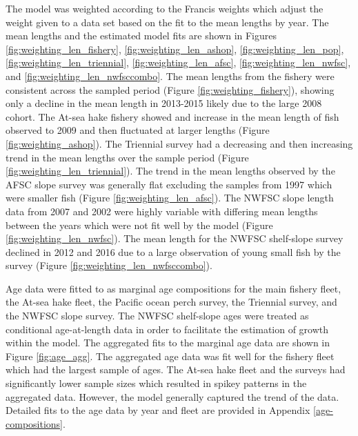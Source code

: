 \documentclass[12pt,]{article}
\begin{document}
The model was weighted according to the Francis weights which adjust the
weight given to a data set based on the fit to the mean lengths by year.
The mean lengths and the estimated model fits are shown in Figures
\ref{fig:weighting_len_fishery}, \ref{fig:weighting_len_ashop},
\ref{fig:weighting_len_pop}, \ref{fig:weighting_len_triennial},
\ref{fig:weighting_len_afsc}, \ref{fig:weighting_len_nwfsc}, and
\ref{fig:weighting_len_nwfsccombo}. The mean lengths from the fishery
were consistent across the sampled period (Figure
\ref{fig:weighting_fishery}), showing only a decline in the mean length
in 2013-2015 likely due to the large 2008 cohort. The At-sea hake
fishery showed and increase in the mean length of fish observed to 2009
and then fluctuated at larger lengths (Figure
\ref{fig:weighting_ashop}). The Triennial survey had a decreasing and
then increasing trend in the mean lengths over the sample period (Figure
\ref{fig:weighting_len_triennial}). The trend in the mean lengths
observed by the AFSC slope survey was generally flat excluding the
samples from 1997 which were smaller fish (Figure
\ref{fig:weighting_len_afsc}). The NWFSC slope length data from 2007 and
2002 were highly variable with differing mean lengths between the years
which were not fit well by the model (Figure
\ref{fig:weighting_len_nwfsc}). The mean length for the NWFSC
shelf-slope survey declined in 2012 and 2016 due to a large observation
of young small fish by the survey (Figure
\ref{fig:weighting_len_nwfsccombo}).

Age data were fitted to as marginal age compositions for the main
fishery fleet, the At-sea hake fleet, the Pacific ocean perch survey,
the Triennial survey, and the NWFSC slope survey. The NWFSC shelf-slope
ages were treated as conditional age-at-length data in order to
facilitate the estimation of growth within the model. The aggregated
fits to the marginal age data are shown in Figure \ref{fig:age_agg}. The
aggregated age data was fit well for the fishery fleet which had the
largest sample of ages. The At-sea hake fleet and the surveys had
significantly lower sample sizes which resulted in spikey patterns in
the aggregated data. However, the model generally captured the trend of
the data. Detailed fits to the age data by year and fleet are provided
in Appendix \ref{age-compositions}.
\end{document}
